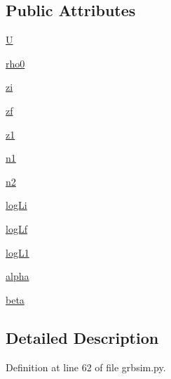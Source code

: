 \subsection*{Public Attributes}
\begin{DoxyCompactItemize}
\item 
\hyperlink{classgrbsim_1_1_population_a142257ab80688d2ce937e9fc8e960e96}{U}
\item 
\hyperlink{classgrbsim_1_1_population_aa7e089ed973dfa3c856e9e2dc67cae48}{rho0}
\item 
\hyperlink{classgrbsim_1_1_population_a7780a80e30452b2a4682f7b6f2bf0d18}{zi}
\item 
\hyperlink{classgrbsim_1_1_population_ac6613ab254b2366c6fac7ba50e4734d7}{zf}
\item 
\hyperlink{classgrbsim_1_1_population_a2d1535d9af34a3e9355d05734e1d7c94}{z1}
\item 
\hyperlink{classgrbsim_1_1_population_a3e5dfa08846efa032f7ee66857b82b3b}{n1}
\item 
\hyperlink{classgrbsim_1_1_population_a459454cd1bb014924b82cbbce9403cca}{n2}
\item 
\hyperlink{classgrbsim_1_1_population_a33509f2091acc42103779d166c3a370c}{log\-Li}
\item 
\hyperlink{classgrbsim_1_1_population_ac24d080c569dfa5f4981ce019d17ad1a}{log\-Lf}
\item 
\hyperlink{classgrbsim_1_1_population_a9b9c750e6828e4ed66d6a052f8159a1c}{log\-L1}
\item 
\hyperlink{classgrbsim_1_1_population_a3bd729ea7c1a389c8d6377506e2de622}{alpha}
\item 
\hyperlink{classgrbsim_1_1_population_ae00d66b8505071bc2d0c9e9dee32223c}{beta}
\end{DoxyCompactItemize}


\subsection{Detailed Description}


Definition at line 62 of file grbsim.\-py.



